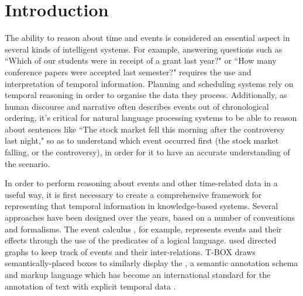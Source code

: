 \documentclass[a4paper,12pt,leqno]{article}
\begin{document}
\section{Introduction}\label{sec:intro}
The ability to reason about time and events is considered an essential aspect in several kinds of intelligent systems. For example, answering questions such as ``Which of our students were in receipt of a grant last year?" or ``How many conference papers were accepted last semester?" requires the use and interpretation of temporal information. Planning and scheduling systems rely on temporal reasoning in order to organise the data they process. Additionally, as human discourse and narrative often describes events out of chronological ordering, it's critical for natural language processing systems to be able to reason about sentences like ``The stock market fell this morning after the controversy last night," so as to understand which event occurred first (the stock market falling, or the controversy), in order for it to have an accurate understanding of the scenario.

In order to perform reasoning about events and other time-related data in a useful way, it is first necessary to create a comprehensive framework for representing that temporal information in knowledge-based systems. Several approaches have been designed over the years, based on a number of conventions and formalisms. The event calculus \citep{Kowalski1986,Miller1999,Mueller2008}, for example, represents events and their effects through the use of the predicates of a logical language. \citet{allen1983maintaining} used directed graphs to keep track of events and their inter-relations. T-BOX \citep{verhagen2005TBOX} draws semantically-placed boxes to similarly display the \citep{timeml2005timeml}, a semantic annotation schema and markup language which has become an international standard \citep{ISO24617-1} for the annotation of text with explicit temporal data \citep{pustejovsky2010iso}.
\end{document}
